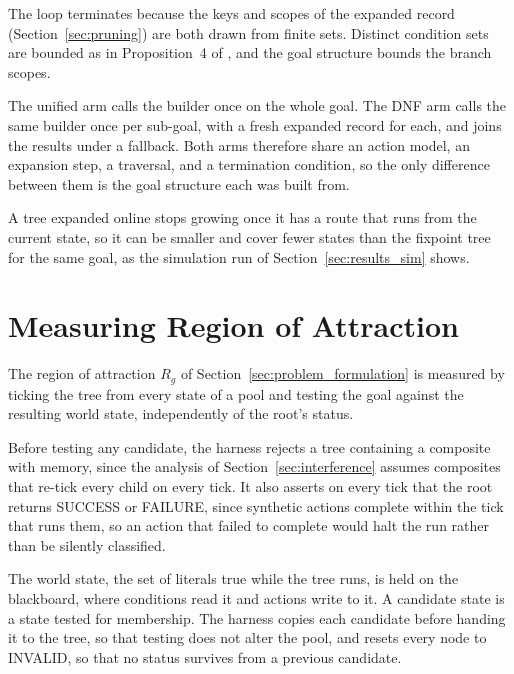     The loop terminates because the keys and scopes of the expanded record (Section~\ref{sec:pruning}) are both drawn from finite sets.
    Distinct condition sets are bounded as in Proposition~4 of \cite{cai2021}, and the goal structure bounds the branch scopes.

    The unified arm calls the builder once on the whole goal.
    The DNF arm calls the same builder once per sub-goal, with a fresh expanded record for each, and joins the results under a fallback.
    Both arms therefore share an action model, an expansion step, a traversal, and a termination condition, so the only difference between them is the goal structure each was built from.

    A tree expanded online stops growing once it has a route that runs from the current state, so it can be smaller and cover fewer states than the fixpoint tree for the same goal, as the simulation run of Section~\ref{sec:results_sim} shows.
    
\section{Measuring Region of Attraction}
\label{sec:membership}
    The region of attraction $R_g$ of Section~\ref{sec:problem_formulation} is measured by ticking the tree from every state of a pool and testing the goal against the resulting world state, independently of the root's status.

    \label{subsec:membership_guards}
    Before testing any candidate, the harness rejects a tree containing a composite with memory, since the analysis of Section~\ref{sec:interference} assumes composites that re-tick every child on every tick.
    It also asserts on every tick that the root returns SUCCESS or FAILURE, since synthetic actions complete within the tick that runs them, so an action that failed to complete would halt the run rather than be silently classified.

    The world state, the set of literals true while the tree runs, is held on the blackboard, where conditions read it and actions write to it.
    A candidate state is a state tested for membership.
    The harness copies each candidate before handing it to the tree, so that testing does not alter the pool, and resets every node to INVALID, so that no status survives from a previous candidate.

